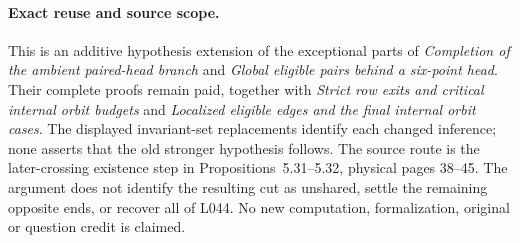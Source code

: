 \documentclass[11pt,a4paper]{article}
\begin{document}
\paragraph{Exact reuse and source scope.}
This is an additive hypothesis extension of the exceptional
parts of \emph{Completion of the ambient paired-head branch}
and \emph{Global eligible pairs behind a six-point head}.
Their complete proofs remain paid, together with
\emph{Strict row exits and critical internal orbit budgets} and
\emph{Localized eligible edges and the final internal orbit cases}.
The displayed invariant-set replacements identify each changed
inference; none asserts that the old stronger hypothesis follows.
The source route is the later-crossing existence step in
Propositions~5.31--5.32, physical pages 38--45.
The argument does not identify the resulting cut as unshared,
settle the remaining opposite ends, or recover all of L044.
No new computation, formalization, original or question credit
is claimed.
\end{document}
